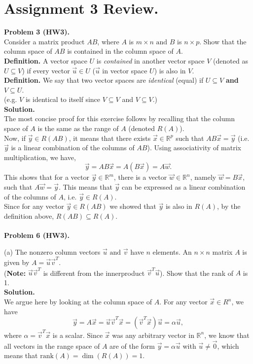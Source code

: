 \documentclass{article}
\newcommand{\R}{\ensuremath{\mathbb{R}}}
\newcommand{\al}{\alpha}
\newcommand{\x}{\times}
\newcommand{\rank}{\mathrm{rank}}
\newcommand{\tand}{\text{ and }}
\begin{document}
\section*{Assignment 3 Review.}
\textbf{Problem 3 (HW3).}\\
Consider a matrix product $AB$, where $A$ is $m\x n \tand B$ is $n\x p$. Show that the column space of $AB$ is contained in the column space of $A$.\\
{\bf Definition.} A vector space $U$ is {\it contained} in another vector space $V$ (denoted as $U \subseteq V$) if every vector $\vec u \in U$ ($\vec u$ in vector space $U$) is also in $V$.
\\
{\bf Definition.} We say that two vector spaces are {\it identical} (equal) if $U \subseteq V$ {\bf and} $V \subseteq U$. \\
(e.g. $V$ is identical to itself since $V \subseteq V$ and $V \subseteq V$.)
\\

\textbf{Solution.}\\
The most concise proof for this exercise follows by recalling that the column space of $A$ is the same as the range of $A$ (denoted $R(A)$).\\
Now, if $\vec y \in R(AB)$, it means that there exists $\vec x \in \R^p$ such that $AB\vec x = \vec y$ (i.e. $\vec y$ is a linear combination of the columns of $AB$). Using associativity of matrix multiplication, we have,
\[ \vec y = AB\vec x = A(B\vec x) = A\vec w. \]
This shows that for a vector $\vec y \in \R^m$, there is a vector $\vec w \in \R^n$, namely $\vec w = B \vec x$, such that $A\vec w = \vec y$. This means that $\vec y$ can be expressed as a linear combination of the columns of $A$, i.e. $\vec y \in R(A)$.\\
Since for any vector $\vec y \in R(AB)$ we showed that $\vec y$ is also in $R(A)$, by the definition above, $R(AB) \subseteq R(A)$.
\\
\\

\textbf{Problem 6 (HW3).}

(a) The nonzero column vectors $\vec{u} \tand \vec{v}$ have $n$ elements. An $n \x n$ matrix $A$ is given by $A = \vec{u}\vec{v}^T$.\\ ({\bf Note:} $\vec{u} \vec{v}^T$ is different from the innerproduct $\vec{v}^T \vec{u}$). Show that the rank of $A$ is 1.\\

\textbf{Solution.}\\
We argue here by looking at the column space of $A$. For any vector $\vec x \in R^n$, we have
\[ \vec y = A \vec x = \vec u \vec v^T \vec x = (\vec v^T \vec x) \vec u = \al \vec u, \] 
where $\al = \vec v^T \vec x$ is a scalar.
Since $\vec x$ was any arbitrary vector in $\R^n$, we know that all vectors in the range space of $A$ are of the form $\vec y = \al \vec u$ with $\vec u \ne \vec 0$, which means that $\rank(A) = \dim(R(A)) = 1$.
\\
\end{document}
